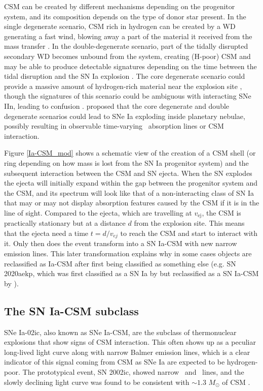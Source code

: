 \documentclass[a4paper,oneside,12pt, class=Latex/Classes/PhDthesisPSnPDF, crop=false]{standalone}
\begin{document}
CSM can be created by different mechanisms depending on the progenitor system, and its composition depends on the type of donor star present. In the single degenerate scenario, CSM rich in hydrogen can be created by a WD generating a fast wind, blowing away a part of the material it received from the mass transfer \citep{single_degen_CSM_gen}. In the double-degenerate scenario, part of the tidally disrupted secondary WD becomes unbound from the system, creating (H-poor) CSM and may be able to produce detectable signatures depending on the time between the tidal disruption and the SN Ia explosion \citep{Double_degen_CSM_gen}. The core degenerate scenario could provide a massive amount of hydrogen-rich material near the explosion site \citep[e.g. for SN 2014J,][]{2014J_core_deg}, though the signatures of this scenario could be ambiguous with interacting SNe IIn, leading to confusion \citep{Inserra_2016}. \citet{snips} proposed that the core degenerate and double degenerate scenarios could lead to SNe Ia exploding inside planetary nebulae, possibly resulting in observable time-varying \NaID\ absorption lines or CSM interaction.

Figure \ref{Ia-CSM_mod} shows a schematic view of the creation of a CSM shell (or ring depending on how mass is lost from the SN Ia progenitor system) and the subsequent interaction between the CSM and SN ejecta. When the SN explodes the ejecta will initially expand within the gap between the progenitor system and the CSM, and its spectrum will look like that of a non-interacting class of SN Ia that may or may not display absorption features caused by the CSM if it is in the line of sight. Compared to the ejecta, which are travelling at $v_\text{ej}$, the CSM is practically stationary but at a distance $d$ from the explosion site. This means that the ejecta need a time $t=d/v_{ej}$ to reach the CSM and start to interact with it. Only then does the event transform into a SN Ia-CSM with new narrow emission lines. This later transformation explains why in some cases objects are reclassified as Ia-CSM after first being classified as something else (e.g. SN 2020aekp, which was first classified as a SN Ia by \citealt{2020aekp_1st_classif} but reclassified as a SN Ia-CSM by \citealt{2020aekp_reclassif}).


\subsection{The SN Ia-CSM subclass}
\label{Ia_CSM}
SNe Ia-02ic, also known as SNe Ia-CSM, are the subclass of thermonuclear explosions that show signs of CSM interaction. This often shows up as a peculiar long-lived light curve along with narrow Balmer emission lines, which is a clear indicator of this signal coming from CSM as SNe Ia are expected to be hydrogen-poor. The prototypical event, SN 2002ic, showed narrow \Halpha\ and \Hbeta\ lines, and the slowly declining light curve was found to be consistent with $\sim1.3$ $M_\odot$ of CSM \citep{02ic_H_det, Hamuy_02ic, 02ic_slow_decay, single_degen_CSM_gen}.
\end{document}
